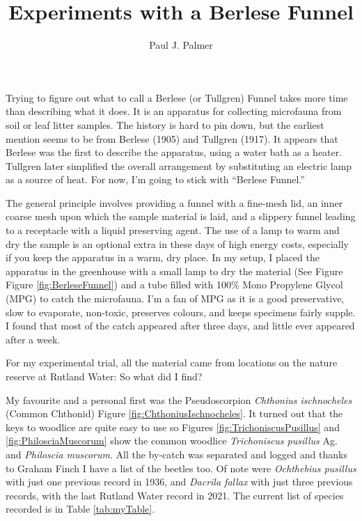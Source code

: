 \documentclass[
]{article}
\title{Experiments with a Berlese Funnel}
\author{Paul J. Palmer}
\date{}
\begin{document}
\maketitle

Trying to figure out what to call a Berlese (or Tullgren) Funnel takes more time than describing what it does. It is an apparatus for collecting microfauna from soil or leaf litter samples. The history is hard to pin down, but the earliest mention seems to be from Berlese (1905) and Tullgren (1917). It appears that Berlese was the first to describe the apparatus, using a water bath as a heater. Tullgren later simplified the overall arrangement by substituting an electric lamp as a source of heat. For now, I'm going to stick with ``Berlese Funnel.''

The general principle involves providing a funnel with a fine-mesh lid, an inner coarse mesh upon which the sample material is laid, and a slippery funnel leading to a receptacle with a liquid preserving agent. The use of a lamp to warm and dry the sample is an optional extra in these days of high energy costs, especially if you keep the apparatus in a warm, dry place. In my setup, I placed the apparatus in the greenhouse with a small lamp to dry the material (See Figure Figure \ref{fig:BerleseFunnel}) and a tube filled with 100\% Mono Propylene Glycol (MPG) to catch the microfauna. I'm a fan of MPG as it is a good preservative, slow to evaporate, non-toxic, preserves colours, and keeps specimens fairly supple. I found that most of the catch appeared after three days, and little ever appeared after a week.

For my experimental trial, all the material came from locations on the nature reserve at Rutland Water: So what did I find?

My favourite and a personal first was the Pseudoscorpion \emph{Chthonius ischnocheles} (Common Chthonid) Figure \ref{fig:ChthoniusIschnocheles}. It turned out that the keys to woodlice are quite easy to use so Figures \ref{fig:TrichoniscusPusillus} and \ref{fig:PhilosciaMuscorum} show the common woodlice \textit{Trichoniscus pusillus} Ag. and \textit{Philoscia muscorum}. All the by-catch was separated and logged and thanks to Graham Finch I have a list of the beetles too. Of note were \emph{Ochthebius pusillus} with just one previous record in 1936, and \emph{Dacrila fallax} with just three previous records, with the last Rutland Water record in 2021. The current list of species recorded is in Table \ref{tab:myTable}.
\end{document}
